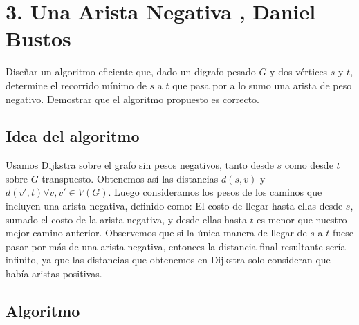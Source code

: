 \documentclass{article}
\begin{document}
\section*{3. Una Arista Negativa , Daniel Bustos}

Diseñar un algoritmo eficiente que, dado un digrafo pesado \( G \) y dos vértices \( s \) y \( t \), determine el recorrido mínimo de \( s \) a \( t \) que pasa por a lo sumo una arista de peso negativo. Demostrar que el algoritmo propuesto es correcto.

\subsection*{Idea del algoritmo}

Usamos Dijkstra sobre el grafo sin pesos negativos, tanto desde \( s \) como desde \( t \) sobre \( G \) transpuesto. Obtenemos así las distancias \( d(s, v) \) y \( d(v', t) \forall v, v' \in V(G) \). Luego consideramos los pesos de los caminos que incluyen una arista negativa, definido como: El costo de llegar hasta ellas desde \( s \), sumado el costo de la arista negativa, y desde ellas hasta \( t \) es menor que nuestro mejor camino anterior. Observemos que si la única manera de llegar de \( s \) a \( t \) fuese pasar por más de una arista negativa, entonces la distancia final resultante sería infinito, ya que las distancias que obtenemos en Dijkstra solo consideran que había aristas positivas.

\subsection*{Algoritmo}
\end{document}
